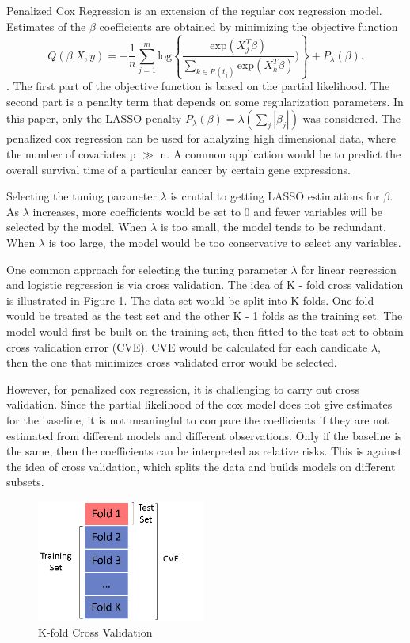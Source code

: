 \documentclass{article}\usepackage[]{graphicx}\usepackage[]{color}
\begin{document}
Penalized Cox Regression is an extension of the regular cox regression model. Estimates of the $\beta$ coefficients are obtained by minimizing the objective function \begin{equation}  Q(\beta |X, y) = - \frac{1}{n}  \sum_{j=1}^{m} \text{log} \left \{\frac{\text{exp} ( X_{j}^{T} \beta)}{\sum_{ k \in R(t_{j})}\text{exp} ( X_{k}^{T} \beta)}) \right \} + P_{\lambda}(\beta). \end{equation} \citep{Simon2011}. The first part of the objective function is based on the partial likelihood. The second part is a penalty term that depends on some regularization parameters. In this paper, only the LASSO penalty $P_{\lambda}(\beta) = \lambda (\sum_{j} |\beta_{j}|)$ was considered. The penalized cox regression can be used for analyzing high dimensional data, where the number of covariates p $\gg$ n. A common application would be to predict the overall survival time of a particular cancer by certain gene expressions.

Selecting the tuning parameter $\lambda$ is crutial to getting LASSO estimations for $\beta$. As $\lambda$ increases, more coefficients would be set to 0 and fewer variables will be selected by the model. When $\lambda$ is too small, the model tends to be redundant. When $\lambda$ is too large, the model would be too conservative to select any variables.

One common approach for selecting the tuning parameter $\lambda$ for linear regression and logistic regression is via cross validation. The idea of K - fold cross validation is illustrated in Figure 1. The data set would be split into K folds. One fold would be treated as the test set and the other K - 1 folds as the training set. The model would first be built on the training set, then fitted to the test set to obtain cross validation error (CVE).  CVE would be calculated for each candidate $\lambda$, then the one that minimizes cross validated error would be selected.

However, for penalized cox regression, it is challenging to carry out cross validation. Since the partial likelihood of the cox model does not give estimates for the baseline, it is not meaningful to compare the coefficients if they are not estimated from different models and different observations. Only if the baseline is the same, then the coefficients can be interpreted as relative risks. This is against the idea of cross validation, which splits the data and builds models on different subsets.

\begin{figure}
    \centering
		\includegraphics[height= 4cm ]{./figures/cv.png}	
    \caption{K-fold Cross Validation}
\end{figure}	
\end{document}
